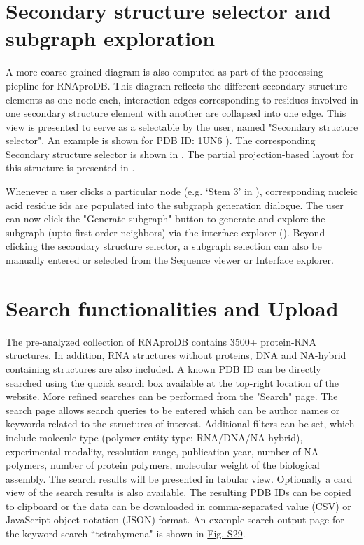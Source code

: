 \section{Secondary structure selector and subgraph exploration}

A more coarse grained diagram is also computed as part of the processing piepline for RNAproDB. This diagram reflects the different secondary structure elements as one node each, interaction edges corresponding to residues involved in one secondary structure element with another are collapsed into one edge. This view is presented to serve as a selectable by the user, named "Secondary structure selector". An example is shown for PDB ID: 1UN6 ). The corresponding Secondary structure selector is shown in . The partial projection-based layout for this structure is presented in . 

Whenever a user clicks a particular node (e.g. `Stem 3' in ), corresponding nucleic acid residue ids are populated into the subgraph generation dialogue. The user can now click the "Generate subgraph" button to generate and explore the subgraph (upto first order neighbors) via the interface explorer (). Beyond clicking the secondary structure selector, a subgraph selection can also be manually entered or selected from the Sequence viewer or Interface explorer. 

\section{Search functionalities and Upload}

The pre-analyzed collection of RNAproDB contains 3500+ protein-RNA structures. In addition, RNA structures without proteins, DNA and NA-hybrid containing structures are also included. A known PDB ID can be directly searched using the qucick search box available at the top-right location of the website. More refined searches can be performed from the "Search" page. The search page allows search queries to be entered which can be author names or keywords related to the structures of interest. Additional filters can be set, which include molecule type (polymer entity type: RNA/DNA/NA-hybrid), experimental modality, resolution range, publication year, number of NA polymers, number of protein polymers, molecular weight of the biological assembly. The search results will be presented in tabular view. Optionally a card view of the search results is also available. The resulting PDB IDs can be copied to clipboard or the data can be downloaded in comma-separated value (CSV) or JavaScript object notation (JSON) format. An example search output page for the keyword search ``tetrahymena" is shown in \hyperref[fig:rnaprodbS1]{Fig. S29}.

